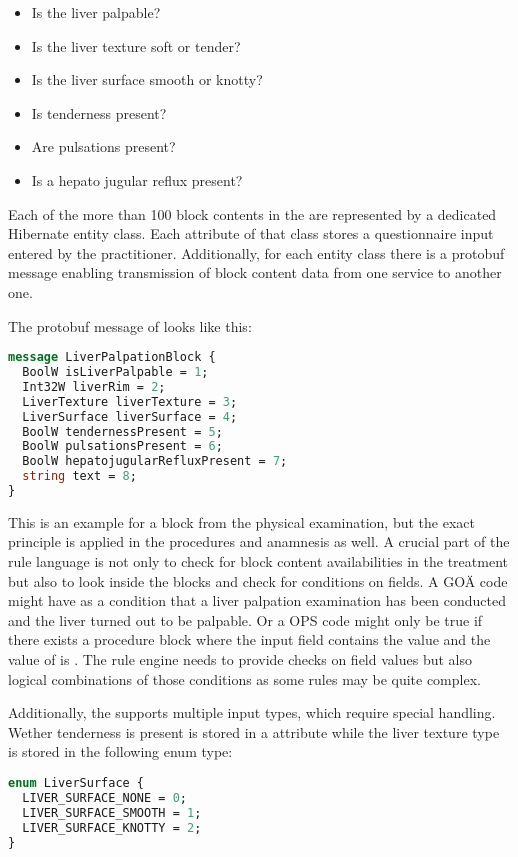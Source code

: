 \begin{itemize}
    \item Is the liver palpable?
    \item Is the liver texture soft or tender?
    \item Is the liver surface smooth or knotty?
    \item Is tenderness present?
    \item Are pulsations present?
    \item Is a hepato jugular reflux present?
\end{itemize}

Each of the more than 100 block contents in the \AVS are represented by a dedicated Hibernate entity class.
Each attribute of that class stores a questionnaire input entered by the practitioner.
Additionally, for each entity class there is a protobuf message enabling transmission of block content data from one service to another one.

The protobuf message of  looks like this:

\begin{lstlisting}[language=protobuf, caption={Liver Palpation Block}, label={lst:protobuf_example}]
message LiverPalpationBlock {
  BoolW isLiverPalpable = 1;
  Int32W liverRim = 2;
  LiverTexture liverTexture = 3;
  LiverSurface liverSurface = 4;
  BoolW tendernessPresent = 5;
  BoolW pulsationsPresent = 6;
  BoolW hepatojugularRefluxPresent = 7;
  string text = 8;
}
\end{lstlisting}

This is an example for a block from the physical examination, but the exact principle is applied in the procedures and anamnesis as well.
A crucial part of the rule language is not only to check for block content availabilities in the treatment but also to look inside the blocks and check for conditions on fields.
A GOÄ code might have as a condition that a liver palpation examination has been conducted and the liver turned out to be palpable.
Or a OPS code might only be true if there exists a procedure block  where the input field  contains the value  and the value of  is .
The rule engine needs to provide checks on field values but also logical combinations of those conditions as some rules may be quite complex.

Additionally, the \AVS supports multiple input types, which require special handling.
Wether tenderness is present is stored in a  attribute while the liver texture type is stored in the following enum type:
\begin{lstlisting}[language=protobuf, caption={Liver Palpation Block}, label={lst:protobuf_example}]
enum LiverSurface {
  LIVER_SURFACE_NONE = 0;
  LIVER_SURFACE_SMOOTH = 1;
  LIVER_SURFACE_KNOTTY = 2;
}
\end{lstlisting}

